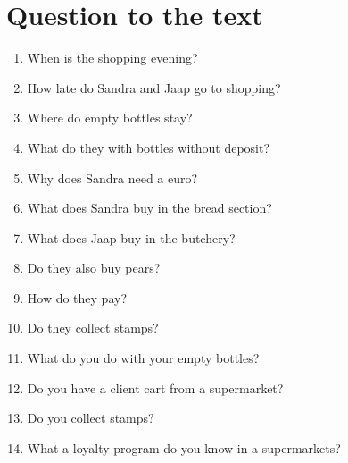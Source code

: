 \documentclass{tstextbook}
\begin{document}
\newpage

 \section{Question to the text}
 
 \begin{enumerate}
 	\item When is the shopping evening?
 	\item How late do Sandra and Jaap go to shopping?
 	\item Where do empty bottles stay?
 	\item What do they with bottles without deposit?
 	\item Why does Sandra need a euro?
 	\item What does Sandra buy in the bread section?
 	\item What does Jaap buy in the butchery?
 	\item Do they also buy pears?
 	\item How do they pay?
 	\item Do they collect stamps?
 	
 	\newline
 	
 	\item What do you do with your empty bottles?
 	\item Do you have a client cart from a supermarket?
 	\item Do you collect stamps?
 	\item What a loyalty program do you know in a supermarkets?
 	
 	
 \end{enumerate}
	
	
	
	
	\printindex
	
\end{document}
